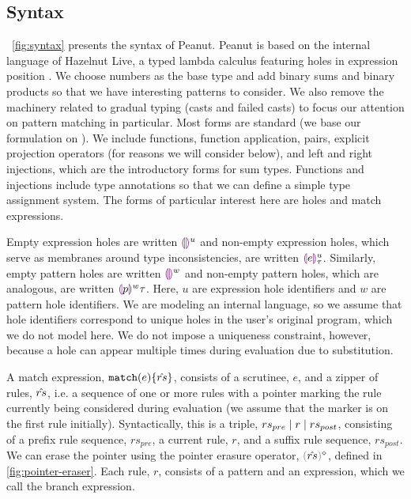 \subsection{Syntax}
\label{sec:Syntax}
\figurename~\ref{fig:syntax} presents the syntax of Peanut.
Peanut is based on the internal language of Hazelnut Live, a typed lambda calculus featuring holes in expression position \cite{DBLP:journals/pacmpl/OmarVCH19}.
We choose numbers as the base type and add binary sums and binary products so that we have interesting
patterns to consider. We also remove the machinery related to gradual typing (casts and failed casts) to focus our attention on pattern matching in particular. Most forms are standard (we base our formulation on \cite{Harper2012}). We include functions, function application, pairs, explicit projection operators (for reasons we will consider below), and left and right injections, which are the introductory forms for sum types. Functions and injections include type annotations so that we can define a simple type assignment system. The forms of particular interest here are holes and match expressions.

Empty expression holes are written $\textcolor{violet}{\llparenthesis}\textcolor{violet}{\rrparenthesis}^{u}$ and non-empty expression holes, which serve as membranes around type inconsistencies, are written $\textcolor{violet}{\llparenthesis} e\textcolor{violet}{\rrparenthesis}^{u}_{\tau}$. Similarly, empty pattern holes are written $\textcolor{violet}{\llparenthesis}\textcolor{violet}{\rrparenthesis}^{w}$ and non-empty pattern holes, which are analogous, are written $\textcolor{violet}{\llparenthesis} p\textcolor{violet}{\rrparenthesis}^{w}{\tau}$. Here, $u$ are expression hole identifiers and $w$ are pattern hole identifiers.
We are modeling an internal language, so we assume that hole identifiers 
correspond to unique holes in the user's original program, which we do not model here. We do not impose a uniqueness constraint, however, because a hole can 
appear multiple times during evaluation due to substitution.

A match expression, $\mathtt{match}(e) \{\hat{rs}\}$, 
consists of a scrutinee, $e$, and a zipper of rules, $\hat{rs}$, i.e. a sequence of one or more rules with a pointer marking the rule currently being considered during evaluation (we assume that the marker is on the first rule initially). Syntactically, this is a triple, $rs_{pre} \mid r \mid rs_{post}$, consisting of a prefix rule sequence, $rs_{pre}$, a current rule, $r$, and a suffix rule sequence, $rs_{post}$. We can erase the pointer using the pointer erasure operator, $\rmpointer{\zrules}$, defined in \autoref{fig:pointer-eraser}. 
Each rule, $r$, consists of a pattern and an expression, which we call the branch expression.



